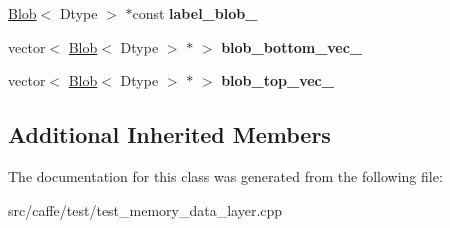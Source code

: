 \begin{DoxyCompactItemize}
\mbox{\hyperlink{classcaffe_1_1_blob}{Blob}}$<$ Dtype $>$ $\ast$const {\bfseries label\+\_\+blob\+\_\+}
\item 
\mbox{\label{classcaffe_1_1_memory_data_layer_test_a5228faf8ec75f4fe253a425233e64027}} 
vector$<$ \mbox{\hyperlink{classcaffe_1_1_blob}{Blob}}$<$ Dtype $>$ $\ast$ $>$ {\bfseries blob\+\_\+bottom\+\_\+vec\+\_\+}
\item 
\mbox{\label{classcaffe_1_1_memory_data_layer_test_aa27ad7286f0c5b6f88d4a3daa2ab9f4e}} 
vector$<$ \mbox{\hyperlink{classcaffe_1_1_blob}{Blob}}$<$ Dtype $>$ $\ast$ $>$ {\bfseries blob\+\_\+top\+\_\+vec\+\_\+}
\end{DoxyCompactItemize}
\subsection*{Additional Inherited Members}


The documentation for this class was generated from the following file\+:\begin{DoxyCompactItemize}
\item 
src/caffe/test/test\+\_\+memory\+\_\+data\+\_\+layer.\+cpp\end{DoxyCompactItemize}
